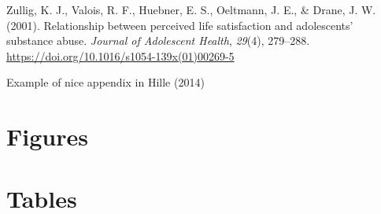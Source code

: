 \documentclass[a4, 12pt]{article}
\begin{document}
\leavevmode\hypertarget{ref-Zullig2001}{}%
Zullig, K. J., Valois, R. F., Huebner, E. S., Oeltmann, J. E., \& Drane, J. W. (2001). Relationship between perceived life satisfaction and adolescents' substance abuse. \emph{Journal of Adolescent Health}, \emph{29}(4), 279--288. \url{https://doi.org/10.1016/s1054-139x(01)00269-5}

\clearpage

\hypertarget{appendix-appendix}{%
\appendix}


Example of nice appendix in Hille (2014)

\hypertarget{figures}{%
\section{Figures}\label{figures}}

\clearpage

\hypertarget{tables}{%
\section{Tables}\label{tables}}
\end{document}
